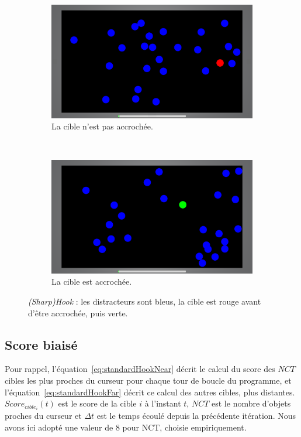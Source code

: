 	\begin{figure}[!htb]
		\begin{subfigure}[t]{0.49\textwidth}
			\centering
			\includegraphics[width=\textwidth]{figures/ch5/hook_red}
			\caption{La cible n'est pas accrochée.}
			\label{fig:hook_red}
		\end{subfigure}
		~
		\begin{subfigure}[t]{0.49\textwidth}
			\centering
			\includegraphics[width=\textwidth]{figures/ch5/hook_green}
			\caption{La cible est accrochée.}
			\label{fig:hook_green}
		\end{subfigure}
		\caption[Application pour l'évaluation de \emph{SharpHook}]{\emph{(Sharp)Hook} : les distracteurs sont bleus, la cible est rouge avant d'être accrochée, puis verte.}
		\label{fig:hook_red_green}
	\end{figure}

	
	\subsection{Score biaisé}
	Pour rappel, l'équation~\ref{eq:standardHookNear} décrit le calcul du score des $NCT$ cibles les plus proches du curseur pour chaque tour de boucle du programme, et l'équation~\ref{eq:standardHookFar} décrit ce calcul des autres cibles, plus distantes. $Score_{cible_{i}}(t)$ est le score de la cible $i$ à l'instant $t$, $NCT$ est le nombre d'objets proches du curseur et $\Delta{}t$ est le temps écoulé depuis la précédente itération. Nous avons ici adopté une valeur de 8 pour NCT, choisie empiriquement.
	
